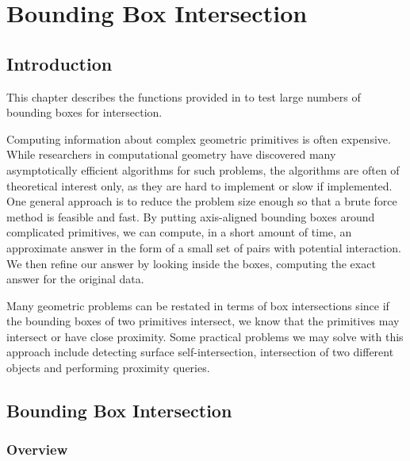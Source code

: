 \chapter*{Bounding Box Intersection}

\section*{Introduction}
This chapter describes the functions provided in \cgal{} 
to test large numbers of bounding boxes for intersection.

Computing information about complex geometric primitives is often expensive. While researchers in computational geometry have discovered many asymptotically efficient algorithms for such problems, the algorithms are often of theoretical interest only, as they are hard to implement or slow if implemented. One general approach is to reduce the problem size enough so that a brute force method is feasible and fast. By putting axis-aligned bounding boxes around complicated primitives, we can compute, in a short amount of time, an approximate answer in the form of a small set of pairs with potential interaction.  We then refine our answer by looking inside the boxes, computing the exact answer for the original data.

Many geometric problems can be restated in terms of box intersections since if the bounding boxes of two primitives intersect, we know that the primitives may intersect or have close proximity. Some practical problems we may solve with this approach include detecting surface self-intersection, intersection of two different objects and performing proximity queries. 

\section*{Bounding Box Intersection}
\subsection*{Overview}


